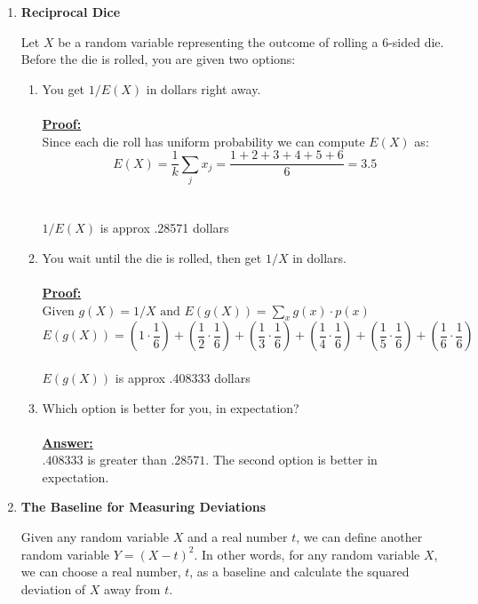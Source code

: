 \documentclass[12pt,a4paper]{article}
\numberwithin{equation}{subsection}
\begin{document}
\begin{enumerate}
\begin{enumerate}
\end{enumerate}

\item \textbf{Reciprocal Dice}

Let $X$ be a random variable representing the outcome of rolling a 6-sided die.  Before the die is rolled, you are given two options:

\begin{enumerate}
\item You get $1/E(X)$ in dollars right away.
\\
\\
\textbf{\underline{Proof:}}
\\
Since each die roll has uniform probability we can compute $E(X)$ as:
\\
$$E(X) = \frac{1}{k}{\sum_j x_j} = \frac{1+2+3+4+5+6}{6} = 3.5$$
\\
\\
$1/E(X)$ is approx .28571 dollars

\item You wait until the die is rolled, then get $1/X$ in dollars.
\\
\\
\textbf{\underline{Proof:}}
\\
$\text{Given } g(X) = 1/X \text{ and } E(g(X)) = \sum_x g(x) \cdot p(x)$
\\
$$E(g(X)) = (1 \cdot \frac{1}{6}) + (\frac{1}{2} \cdot \frac{1}{6}) + (\frac{1}{3} \cdot \frac{1}{6}) + (\frac{1}{4} \cdot \frac{1}{6}) + (\frac{1}{5} \cdot \frac{1}{6}) + (\frac{1}{6} \cdot \frac{1}{6})$$
\\
$E(g(X))$ is approx .408333 dollars

\item Which option is better for you, in expectation?
\\
\\
\textbf{\underline{Answer:}}
\\
$.408333$ is greater than $.28571$. The second option is better in expectation.

\end{enumerate}

\item \textbf{The Baseline for Measuring Deviations}

Given any random variable $X$ and a real number $t$, we can define another random variable $Y = (X - t)^2$. In other words, for any random variable $X$, we can choose a real number, $t$, as a baseline and calculate the squared deviation of $X$ away from $t$.


\end{enumerate}
\end{document}
